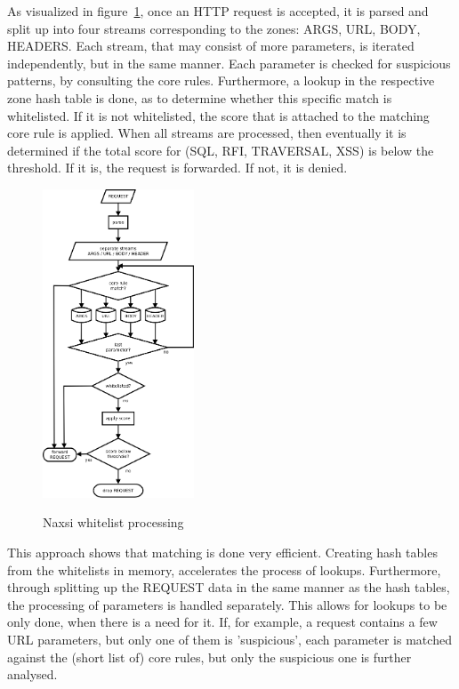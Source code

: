 \documentclass[Naxsi]{subfiles}
\begin{document}
As visualized in figure~\ref{fig:whitelist_processing}, once an HTTP request is accepted, it is parsed and split up into four streams corresponding to the zones: ARGS, URL, BODY, HEADERS. Each stream, that may consist of more parameters, is iterated independently, but in the same manner. Each parameter is checked for suspicious patterns, by consulting the core rules. Furthermore, a lookup in the respective zone hash table is done, as to determine whether this specific match is whitelisted. If it is not whitelisted, the score that is attached to the matching core rule is applied. When all streams are processed, then eventually it is determined if the total score for (SQL, RFI, TRAVERSAL, XSS) is below the threshold. If it is, the request is forwarded. If not, it is denied. 

\begin{figure}[H]
\caption{Naxsi whitelist processing}
\centering
\includegraphics[width=0.4\textwidth] {images/whitelist_processing.png}
\label{fig:whitelist_processing}
\end{figure}

This approach shows that matching is done very efficient. Creating hash tables from the whitelists in memory, accelerates the process of lookups. Furthermore, through splitting up the REQUEST data in the same manner as the hash tables, the processing of parameters is handled separately. This allows for lookups to be only done, when there is a need for it. If, for example, a request contains a few URL parameters, but only one of them is 'suspicious', each parameter is matched against the (short list of) core rules, but only the suspicious one is further analysed.
\end{document}
